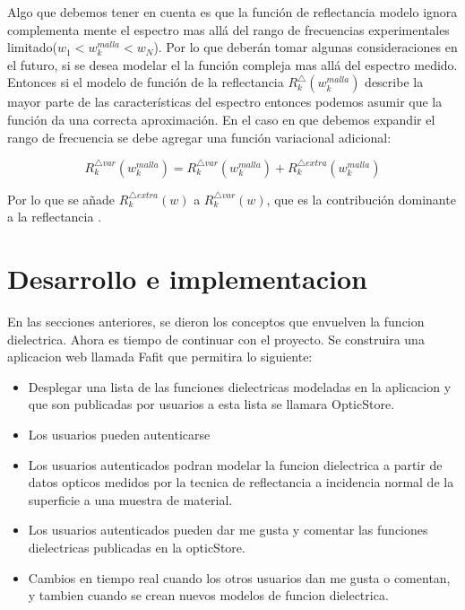 \documentclass[a4paper,openright,12pt]{book}
\begin{document}
Algo que debemos tener en cuenta es que la función de reflectancia modelo ignora complementa mente el espectro mas allá del rango de frecuencias experimentales limitado($w_{1} <w_{k}^{malla} <w_{N}$). Por lo que deberán tomar algunas consideraciones en el futuro, si se desea modelar el la función compleja mas allá del espectro medido. Entonces si el modelo de función de la reflectancia $R_{k}^{\bigtriangleup}(w_{k}^{malla})$ describe la mayor parte de las características del espectro entonces podemos asumir que la función da una correcta aproximación. En el caso en que debemos expandir el rango de frecuencia se debe agregar una función variacional adicional\cite{guide}:

\begin{equation}
R_{k}^{\bigtriangleup var}(w_{k}^{malla})=R_{k}^{\bigtriangleup var}(w_{k}^{malla})+R_{k}^{\bigtriangleup extra}(w_{k}^{malla})
\end{equation}

Por lo que se añade $R_{k}^{\bigtriangleup extra}(w)$ a $R_{k}^{\bigtriangleup var}(w)$, que es la contribución dominante a la reflectancia \cite{guide}.\\


\chapter{Desarrollo e implementacion}
En las secciones anteriores, se dieron los conceptos que envuelven la funcion dielectrica. Ahora es tiempo de continuar con el proyecto. Se construira una aplicacion web llamada Fafit que permitira lo siguiente:
\begin{itemize}
\item Desplegar una lista de las funciones dielectricas modeladas en la aplicacion y que son publicadas por usuarios a esta lista se llamara OpticStore.
\item Los usuarios pueden autenticarse
\item Los usuarios autenticados podran modelar la funcion dielectrica a partir de datos opticos medidos por la tecnica de reflectancia a incidencia normal de la superficie a una muestra de material.
\item Los usuarios autenticados pueden dar me gusta y comentar las funciones dielectricas publicadas en la opticStore.
\item Cambios en tiempo real cuando los otros usuarios dan me gusta o comentan, y tambien cuando se crean nuevos modelos de funcion dielectrica.
\end{itemize}
\end{document}

